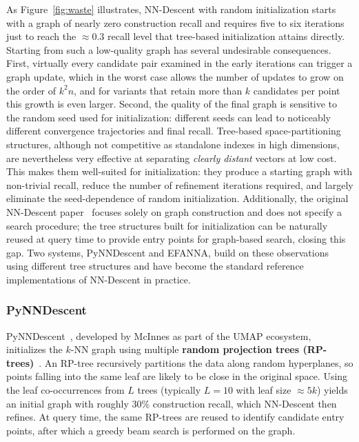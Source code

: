 As Figure~\ref{fig:waste} illustrates, NN-Descent with random initialization starts with a graph of nearly zero construction recall and requires five to six iterations just to reach the $\approx 0.3$ recall level that tree-based initialization attains directly.
Starting from such a low-quality graph has several undesirable consequences.
First, virtually every candidate pair examined in the early iterations can trigger a graph update, which in the worst case allows the number of updates to grow on the order of $k^2 n$, and for variants that retain more than $k$ candidates per point this growth is even larger.
Second, the quality of the final graph is sensitive to the random seed used for initialization: different seeds can lead to noticeably different convergence trajectories and final recall.
Tree-based space-partitioning structures, although not competitive as standalone indexes in high dimensions, are nevertheless very effective at separating \emph{clearly distant} vectors at low cost.
This makes them well-suited for initialization: they produce a starting graph with non-trivial recall, reduce the number of refinement iterations required, and largely eliminate the seed-dependence of random initialization.
Additionally, the original NN-Descent paper~\cite{dong2011} focuses solely on graph construction and does not specify a search procedure; the tree structures built for initialization can be naturally reused at query time to provide entry points for graph-based search, closing this gap.
Two systems, PyNNDescent and EFANNA, build on these observations using different tree structures and have become the standard reference implementations of NN-Descent in practice.

\subsubsection{PyNNDescent}
\label{sec:pynndescent}

PyNNDescent~\cite{pynndescent}, developed by McInnes as part of the UMAP ecosystem, initializes the $k$-NN graph using multiple \textbf{random projection trees (RP-trees)}~\cite{dasgupta2008}.
An RP-tree recursively partitions the data along random hyperplanes, so points falling into the same leaf are likely to be close in the original space.
Using the leaf co-occurrences from $L$ trees (typically $L = 10$ with leaf size $\approx 5k$) yields an initial graph with roughly 30\% construction recall, which NN-Descent then refines.
At query time, the same RP-trees are reused to identify candidate entry points, after which a greedy beam search is performed on the graph.

